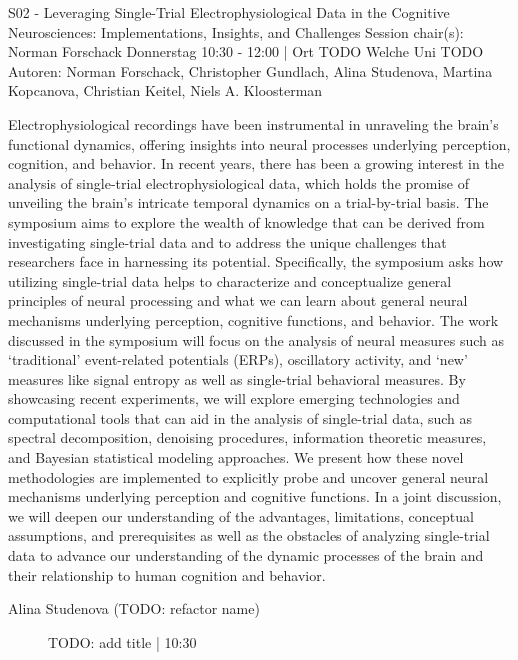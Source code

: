 
            \begin{symposium}
            {S02 - Leveraging Single-Trial Electrophysiological Data in the Cognitive Neurosciences: Implementations, Insights, and Challenges}
            {Session chair(s): Norman Forschack}
            {Donnerstag 10:30 - 12:00 | Ort TODO}
            {Welche Uni TODO}
            Autoren: Norman Forschack, Christopher Gundlach, Alina Studenova, Martina Kopcanova, Christian Keitel, Niels A. Kloosterman

Electrophysiological recordings have been instrumental in unraveling the brain's functional dynamics, offering insights into neural processes underlying perception, cognition, and behavior. In recent years, there has been a growing interest in the analysis of single-trial electrophysiological data, which holds the promise of unveiling the brain's intricate temporal dynamics on a trial-by-trial basis. The symposium aims to explore the wealth of knowledge that can be derived from investigating single-trial data and to address the unique challenges that researchers face in harnessing its potential.
Specifically, the symposium asks how utilizing single-trial data helps to characterize and conceptualize general principles of neural processing and what we can learn about general neural mechanisms underlying perception, cognitive functions, and behavior. The work discussed in the symposium will focus on the analysis of neural measures such as ‘traditional’ event-related potentials (ERPs), oscillatory activity, and ‘new’ measures like signal entropy as well as single-trial behavioral measures. By showcasing recent experiments, we will explore emerging technologies and computational tools that can aid in the analysis of single-trial data, such as spectral decomposition, denoising procedures, information theoretic measures, and Bayesian statistical modeling approaches. We present how these novel methodologies are implemented to explicitly probe and uncover general neural mechanisms underlying perception and cognitive functions. In a joint discussion, we will deepen our understanding of the advantages, limitations, conceptual assumptions, and prerequisites as well as the obstacles of analyzing single-trial data to advance our understanding of the dynamic processes of the brain and their relationship to human cognition and behavior.
            \begin{description}    
            
                \item [Alina Studenova  (TODO: refactor name)] TODO: add title \textcolor{mygray}{ | 10:30}    
                

\end{description}
\end{symposium}
